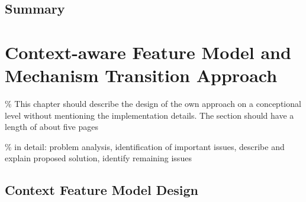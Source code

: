 \section{Summary}

\chapter{Context-aware Feature Model and Mechanism Transition Approach}

\% This chapter should describe the design of the own approach on a conceptional level without mentioning the implementation details. The section should have a length of about five pages

\% in detail: problem analysis, identification of important issues, describe and explain proposed solution, identify remaining issues



\section{Context Feature Model Design}
